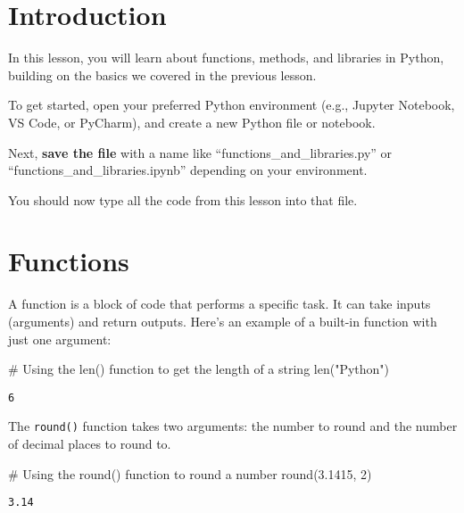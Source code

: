 \documentclass[
  letterpaper,
  DIV=11,
  numbers=noendperiod]{scrreprt}
\newenvironment{Shaded}{\begin{snugshade}}{\end{snugshade}}
\newcommand{\BuiltInTok}[1]{\textcolor[rgb]{0.00,0.23,0.31}{#1}}
\newcommand{\CommentTok}[1]{\textcolor[rgb]{0.37,0.37,0.37}{#1}}
\newcommand{\DecValTok}[1]{\textcolor[rgb]{0.68,0.00,0.00}{#1}}
\newcommand{\FloatTok}[1]{\textcolor[rgb]{0.68,0.00,0.00}{#1}}
\newcommand{\NormalTok}[1]{\textcolor[rgb]{0.00,0.23,0.31}{#1}}
\newcommand{\StringTok}[1]{\textcolor[rgb]{0.13,0.47,0.30}{#1}}
\begin{document}
\section{Introduction}\label{introduction-3}

In this lesson, you will learn about functions, methods, and libraries
in Python, building on the basics we covered in the previous lesson.

To get started, open your preferred Python environment (e.g., Jupyter
Notebook, VS Code, or PyCharm), and create a new Python file or
notebook.

Next, \textbf{save the file} with a name like
``functions\_and\_libraries.py'' or ``functions\_and\_libraries.ipynb''
depending on your environment.

You should now type all the code from this lesson into that file.

\section{Functions}\label{functions}

A function is a block of code that performs a specific task. It can take
inputs (arguments) and return outputs. Here's an example of a built-in
function with just one argument:

\begin{Shaded}
\begin{Highlighting}[]
\CommentTok{\# Using the len() function to get the length of a string}
\BuiltInTok{len}\NormalTok{(}\StringTok{"Python"}\NormalTok{)}
\end{Highlighting}
\end{Shaded}

\begin{verbatim}
6
\end{verbatim}

The \texttt{round()} function takes two arguments: the number to round
and the number of decimal places to round to.

\begin{Shaded}
\begin{Highlighting}[]
\CommentTok{\# Using the round() function to round a number}
\BuiltInTok{round}\NormalTok{(}\FloatTok{3.1415}\NormalTok{, }\DecValTok{2}\NormalTok{)}
\end{Highlighting}
\end{Shaded}

\begin{verbatim}
3.14
\end{verbatim}
\end{document}
